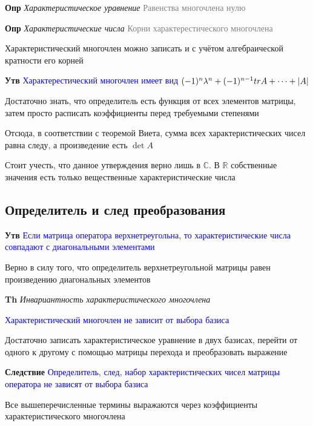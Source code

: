 \textbf{Опр} \textit{Характеристическое уравнение} \textcolor{gray}{Равенства многочлена нулю}

\textbf{Опр} \textit{Характеристические числа} \textcolor{gray}{Корни характерестического многочлена}

Характеристический многочлен можно записать и с учётом алгебраической кратности его корней

\textbf{Утв} \textcolor{blue}{Характерестический многочлен имеет
вид $(-1)^n \lambda^n + (-1)^{n-1} tr A + \dots + \abs{A}$}

Достаточно знать, что определитель есть функция от всех элементов матрицы, затем просто расписать коэффициенты
перед требуемыми степенями

Отсюда, в соответствии с теоремой Виета, сумма всех характеристических чисел равна следу, а произведение есть $\det A$

Стоит учесть, что данное утверждения верно лишь в $\mathbb{C}$.
В $\mathbb{R}$ собственные значения есть только вещественные характеристические числа

\subsection{Определитель и след преобразования}

\textbf{Утв} \textcolor{blue}{Если матрица оператора верхнетреугольна, то характеристические числа совпадают с
диагональными элементами}

Верно в силу того, что определитель верхнетреугольной матрицы равен произведению диагональных элементов

\textbf{Th} \textit{Инвариантность характеристического многочлена}

\textcolor{blue}{Характеристический многочлен не зависит от выбора базиса}

Достаточно записать характеристическое уравнение в двух базисах, перейти от одного к другому с помощью матрицы
перехода и преобразовать выражение

\textbf{Следствие} \textcolor{blue}{Определитель, след, набор характеристических чисел матрицы оператора не
зависят от выбора базиса}

Все вышеперечисленные термины выражаются через коэффициенты характеристического многочлена